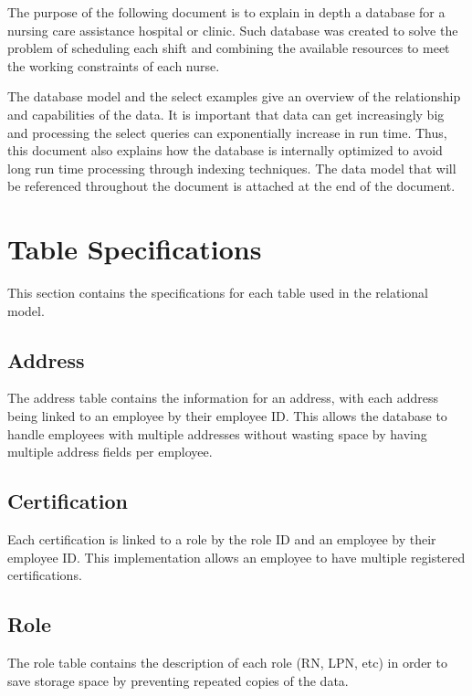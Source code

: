 \documentclass[letter,12pt]{texMemo}
\begin{document}
\maketitle

The purpose of the following document is to explain in depth a database for a nursing care assistance hospital or clinic. Such database was created to solve the problem of scheduling each shift and combining the available resources to meet the working constraints of each nurse.

The database model and the select examples give an overview of the relationship and capabilities of the data. It is important that data can get increasingly big and processing the select queries can exponentially increase in run time. Thus, this document also explains how the database is internally optimized to avoid long run time processing through indexing techniques. The data model that will be referenced throughout the document is attached at the end of the document.
\section*{Table Specifications}
This section contains the specifications for each table used in the relational model.
	\subsection*{Address}
		The address table contains the information for an address, with each address being linked to an employee by their employee ID. This allows the database to handle employees with multiple addresses without wasting space by having multiple address fields per employee.
		
	\newpage
	\subsection*{Certification}
		Each certification is linked to a role by the role ID and an employee by their employee ID. This implementation allows an employee to have multiple registered certifications.
		
	\subsection*{Role}
		The role table contains the description of each role (RN, LPN, etc) in order to save storage space by preventing repeated copies of the data.
		
\end{document}
